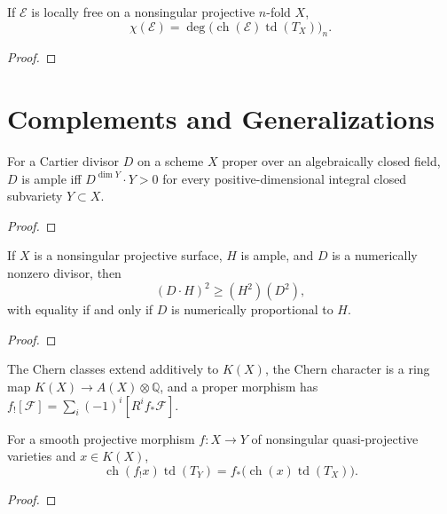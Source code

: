 \begin{theorem}
\label{ha-appA-thm4-1}
If $\mathcal E$ is locally free on a nonsingular projective $n$-fold $X$,
\[
\chi(\mathcal E)=\deg\bigl(\operatorname{ch}(\mathcal E)\operatorname{td}(T_X)\bigr)_n.
\]
\end{theorem}
\begin{proof}
\notready
\end{proof}

\section{Complements and Generalizations}
\label{ha-appA-sec5}

\begin{theorem}
\label{ha-appA-thm5-1}
For a Cartier divisor $D$ on a scheme $X$ proper over an algebraically closed
field, $D$ is ample iff
$D^{\dim Y}\cdot Y>0$ for every positive-dimensional integral closed
subvariety $Y\subset X$.
\end{theorem}
\begin{proof}
\notready
\end{proof}

\begin{theorem}
\label{ha-appA-thm5-2}
If $X$ is a nonsingular projective surface, $H$ is ample, and $D$ is a
numerically nonzero divisor, then
\[
(D\cdot H)^2\geq (H^2)(D^2),
\]
with equality if and only if $D$ is numerically proportional to $H$.
\end{theorem}
\begin{proof}
\notready
\end{proof}

\begin{definition}
The Chern classes extend additively to $K(X)$, the Chern character is a ring
map $K(X)\to A(X)\otimes\mathbb Q$, and a proper morphism has
$f_![\mathcal F]=\sum_i(-1)^i[R^if_*\mathcal F]$.
\end{definition}

\begin{theorem}
\label{ha-appA-thm5-3}
For a smooth projective morphism $f:X\to Y$ of nonsingular quasi-projective
varieties and $x\in K(X)$,
\[
\operatorname{ch}(f_!x)\operatorname{td}(T_Y)
=f_*\bigl(\operatorname{ch}(x)\operatorname{td}(T_X)\bigr).
\]
\end{theorem}
\begin{proof}
\notready
\end{proof}
